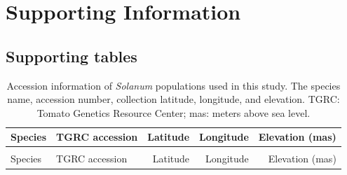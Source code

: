 \documentclass[
  letterpaper,
  DIV=11,
  numbers=noendperiod]{scrartcl}
\providecommand{\DIFaddbegin}{} %
\newcommand{\DIFaddincludegraphics}[2][]{{\color{blue}\fbox{\DIFOincludegraphics[#1]{#2}}}} %
\DeclareRobustCommand{\DIFaddbegin}{\DIFOaddbegin \let\includegraphics\DIFaddincludegraphics} %
\begin{document}
\newpage{}

\section{Supporting Information}\label{supporting-information}

\renewcommand{\thefigure}{S\arabic{figure}}
\renewcommand{\thetable}{S\arabic{table}}
\renewcommand{\theequation}{S\arabic{equation}}
\setcounter{figure}{0}
\setcounter{table}{0}
\setcounter{equation}{0}
\setcounter{page}{1}
\FloatBarrier

\subsection{Supporting tables}\label{supporting-tables}

\DIFaddbegin \begin{longtable}{>{\raggedright\arraybackslash}p{3.25cm}lrrr}

\caption{\label{tbl-populations}Accession information of \emph{Solanum}
populations used in this study. The species name, accession number,
collection latitude, longitude, and elevation. TGRC: Tomato Genetics
Resource Center; mas: meters above sea level.}

\tabularnewline

\toprule
Species & TGRC accession & Latitude & Longitude & Elevation (mas)\\
\midrule
\endfirsthead
\multicolumn{5}{@{}l}{\textit{(continued)}}\\
\toprule
Species & TGRC accession & Latitude & Longitude & Elevation (mas)\\
\midrule
\endhead


\end{longtable}
\end{document}
